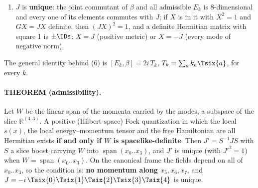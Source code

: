 \begin{enumerate}
        with $\beta$ and all five $E_k$ has $\Tr(GX)=0$, so $GX$ is never positive definite. Analytic
        proof for a purely hidden momentum: $[E_k,\beta]=2i\,k_5\,\Tsix{5}$, so $J'$ commutes with
        $\Tsix{5}$; $\Tsix{5}$ anticommutes with $G$, hence
        $\Tsix{5}^{\dagger}(GJ')\,\Tsix{5}=-(GJ')$: a positive matrix would be congruent to a negative
        one.
  \item $J$ is \textbf{unique}: the joint commutant of $\beta$ and all admissible $E_k$ is
        8-dimensional and every one of its elements commutes with $J$; if $X$ is in it with $X^2=1$
        and $GX=JX$ definite, then $(JX)^2=1$, and a definite Hermitian matrix with square 1 is
        $\pm\IDs$: $X=J$ (positive metric) or $X=-J$ (every mode of negative norm).
\end{enumerate}
The general identity behind (6) is $[E_k,\beta]=2i\,T_k$, $T_k=\sum_a k_a\Tsix{a}$, for every $k$.

\paragraph{THEOREM (admissibility).} Let $W$ be the linear span of the momenta carried by the modes,
a subspace of the slice $\mathbb R^{(4,3)}$. A positive (Hilbert-space) Fock quantization in which
the local $s(x)$, the local energy--momentum tensor and the free Hamiltonian are all Hermitian exists
\textbf{if and only if $W$ is spacelike-definite}. Then $J'=S^{-1}JS$ with $S$ a slice boost carrying
$W$ into $\operatorname{span}(x_0..x_3)$, and $J'$ is unique (with $J'^2=1$) when
$W=\operatorname{span}(x_0..x_3)$. On the canonical frame the fields depend on all of $x_0..x_3$, so
the condition is: \textbf{no momentum along $x_5,x_6,x_7$}, and
$J=-i\,\Tsix{0}\Tsix{1}\Tsix{2}\Tsix{3}\Tsix{4}$ is unique.

